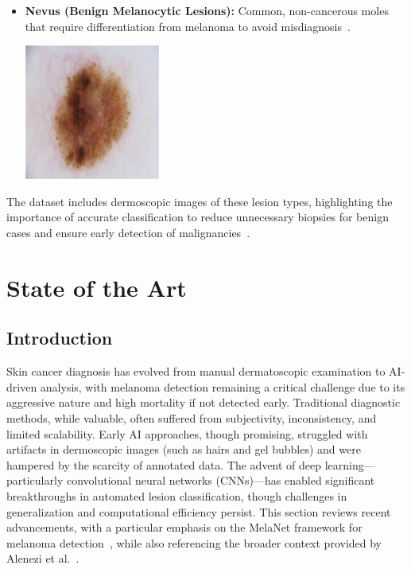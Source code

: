 \documentclass[a4paper,12pt]{report}
\begin{document}
\begin{spacing}{1.5}
\begin{itemize}
        \item \textbf{Nevus (Benign Melanocytic Lesions):} Common, non-cancerous moles that require differentiation from melanoma to avoid misdiagnosis~\cite{dl14,dl15}.
        
        \begin{center}
            \includegraphics[width=0.35\textwidth]{Pics/cancer/nevus.jpg}
        \end{center}
    \end{itemize}
    The dataset includes dermoscopic images of these lesion types, highlighting the importance of accurate classification to reduce unnecessary biopsies for benign cases and ensure early detection of malignancies~\cite{dl15}.

\newpage


\chapter{State of the Art}

    \section{Introduction}
    
    Skin cancer diagnosis has evolved from manual dermatoscopic examination to AI-driven analysis, with melanoma detection remaining a critical challenge due to its aggressive nature and high mortality if not detected early. Traditional diagnostic methods, while valuable, often suffered from subjectivity, inconsistency, and limited scalability. Early AI approaches, though promising, struggled with artifacts in dermoscopic images (such as hairs and gel bubbles) and were hampered by the scarcity of annotated data. The advent of deep learning—particularly convolutional neural networks (CNNs)—has enabled significant breakthroughs in automated lesion classification, though challenges in generalization and computational efficiency persist. This section reviews recent advancements, with a particular emphasis on the MelaNet framework for melanoma detection~\cite{lafraxo2022melanet}, while also referencing the broader context provided by Alenezi et al.~\cite{elgendi2023diagnostics}.
    

\end{spacing}
\end{document}
